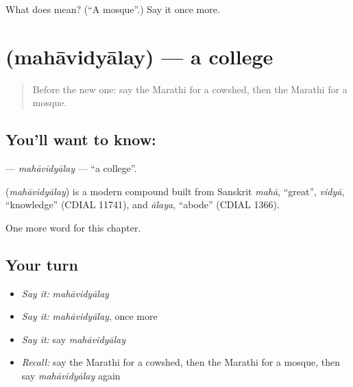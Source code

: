\begin{tcolorbox}[breakable,colback=teal!4,colframe=teal!35!black,title={Before you move on}]
What does  mean? (\textquotedblleft{}A mosque\textquotedblright{}.) Say it once more.
\end{tcolorbox}
\section[\texorpdfstring{\mr{महाविद्यालय} (mahāvidyālay)}{महाविद्यालय (mahāvidyālay)}]{ (mahāvidyālay) — a college}

\label{lesson:MR-C245-mahavidyalay}



\begin{quote}
Before the new one: say the Marathi for a cowshed, then the Marathi for a mosque.
\end{quote}

\subsection*{You'll want to know: }
\textbf{} — \emph{mahāvidyālay} — \textquotedblleft{}a college\textquotedblright{}.

\begin{cousinweb}
\textbf{} (\emph{mahāvidyālay}) is a modern compound built from Sanskrit \emph{mahā}, \textquotedblleft{}great\textquotedblright{}, \emph{vidyā}, \textquotedblleft{}knowledge\textquotedblright{} (CDIAL 11741), and \emph{ālaya}, \textquotedblleft{}abode\textquotedblright{} (CDIAL 1366).
\end{cousinweb}

\begin{grammarlens}[title={What you've built}]
One more word for this chapter.
\end{grammarlens}

\subsection*{Your turn}
\begin{itemize}
\raggedright
  \item \emph{Say it:} \emph{mahāvidyālay}
  \item \emph{Say it:} \emph{mahāvidyālay}, once more
  \item \emph{Say it:} say \emph{mahāvidyālay}
  \item \emph{Recall:} say the Marathi for a cowshed, then the Marathi for a mosque, then say \emph{mahāvidyālay} again
\end{itemize}

